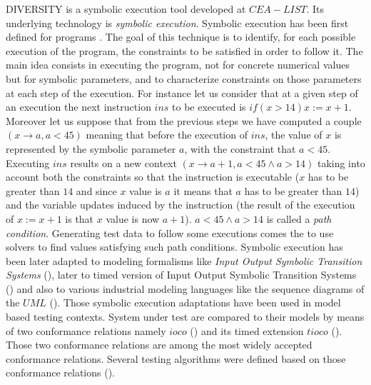 \documentclass{template/openetcs_report}
\begin{document}
DIVERSITY is a symbolic execution tool developed at $CEA-LIST$. Its underlying technology is {\em symbolic execution}.  Symbolic execution has been first defined for programs \cite{King75,Clarke,Rama}. The goal of this technique is to identify, for each possible execution of the program, the constraints to be satisfied in order to follow it.  
The main idea consists in executing the program, not for concrete numerical values but for symbolic parameters, and to characterize constraints on those parameters at each step of the execution. 
For instance let us consider that at a given step of an execution the next instruction $ins$ to be executed is $if(x>14) x:=x+1$. Moreover let us suppose that from the previous steps we have computed a couple $(x\rightarrow a, a<45)$ meaning that before the execution of $ins$, the  value of $x$ is represented by the symbolic parameter $a$, with the constraint that $a<45$. Executing $ins$ results on a new context $(x\rightarrow a+1 , a<45 \land a>14)$ taking into account both the constraints so that the instruction is executable ($x$ has to be greater than $14$ and since $x$ value is $a$ it means that $a$ has to be greater than $14$) and the variable updates induced by the instruction (the result of the execution of $x:=x+1$ is that $x$ value is now $a+1$). $a<45 \land a>14$ is called a {\em path
  condition}. Generating test data to follow some executions comes the to use solvers to find values satisfying such path conditions. 
Symbolic execution has been later adapted to modeling formalisms like {\em Input Output Symbolic Transition Systems} (\cite{RGLG03,GAL00}), later to timed version of Input Output Symbolic Transition Systems (\cite{EGL11,BEGL12}) and also to various industrial modeling languages like the {sequence diagrams} of the $UML$ (\cite{BGS11}). Those symbolic execution adaptations have been used in model based testing contexts. System under test are compared to their models by means of two conformance relations namely {\em $ioco$} (\cite{Tre96a}) and its timed extension {\em $tioco$} (\cite{Kri04}). Those two conformance relations are among the most widely accepted conformance relations. Several testing algorithms were defined based on those conformance relations (\cite{GLRT06, EGL11, BEGL12}).
\end{document}
